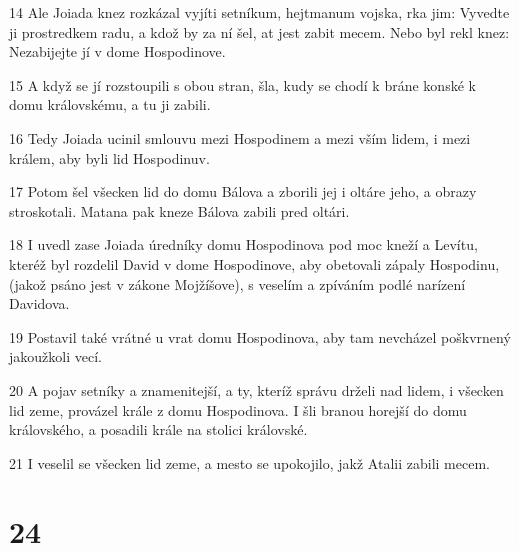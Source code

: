 \par 14 Ale Joiada knez rozkázal vyjíti setníkum, hejtmanum vojska, rka jim: Vyvedte ji prostredkem radu, a kdož by za ní šel, at jest zabit mecem. Nebo byl rekl knez: Nezabijejte jí v dome Hospodinove.
\par 15 A když se jí rozstoupili s obou stran, šla, kudy se chodí k bráne konské k domu královskému, a tu ji zabili.
\par 16 Tedy Joiada ucinil smlouvu mezi Hospodinem a mezi vším lidem, i mezi králem, aby byli lid Hospodinuv.
\par 17 Potom šel všecken lid do domu Bálova a zborili jej i oltáre jeho, a obrazy stroskotali. Matana pak kneze Bálova zabili pred oltári.
\par 18 I uvedl zase Joiada úredníky domu Hospodinova pod moc kneží a Levítu, kteréž byl rozdelil David v dome Hospodinove, aby obetovali zápaly Hospodinu, (jakož psáno jest v zákone Mojžíšove), s veselím a zpíváním podlé narízení Davidova.
\par 19 Postavil také vrátné u vrat domu Hospodinova, aby tam nevcházel poškvrnený jakoužkoli vecí.
\par 20 A pojav setníky a znamenitejší, a ty, kteríž správu drželi nad lidem, i všecken lid zeme, provázel krále z domu Hospodinova. I šli branou horejší do domu královského, a posadili krále na stolici královské.
\par 21 I veselil se všecken lid zeme, a mesto se upokojilo, jakž Atalii zabili mecem.

\chapter{24}

